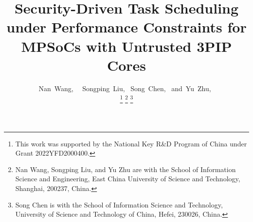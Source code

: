 \documentclass[10pt,journal, compsoc]{IEEEtran}
\begin{document}
%
\title{Security-Driven Task Scheduling under Performance Constraints for MPSoCs with Untrusted 3PIP Cores}
%
%
%
%

\author{Nan~Wang,~
        ~Songping~Liu,%
        ~Song~Chen,~
        and~Yu~Zhu,~

\thanks{This work was supported by the National Key R\&D Program of China under Grant 2022YFD2000400.}
\thanks{Nan Wang, Songping Liu, and Yu Zhu are with the School of Information Science and Engineering, East China University of Science and Technology, Shanghai, 200237, China.}%
\thanks{Song Chen is with the School of Information Science and Technology, University of Science and Technology of China, Hefei, 230026, China.}
}
\end{document}

